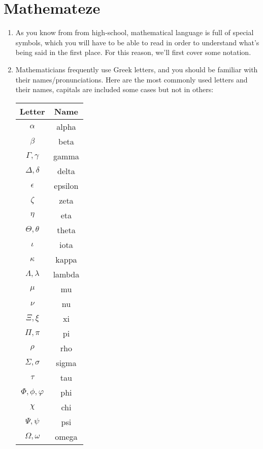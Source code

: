 \section{Mathemateze}

\begin{enumerate}[{\thesection}.1]

		\item As you know from from high-school, mathematical language is full of special symbols, which you will have to be able to read in order to understand what's being said in the first place. For this reason, we'll first cover some notation.
		
		\item Mathematicians frequently use Greek letters, and you should be familiar with their names/pronunciations. Here are the most commonly used letters and their names, capitals are included some cases but not in others:
	
		\begin{longtable}{c | c}
			Letter & Name\\\hline
			$\alpha$ & alpha \\
			$\beta$ & beta\\
			$\Gamma,\gamma$ & gamma\\
			$\Delta,\delta$ & delta\\
			$\epsilon$ & epsilon\\
			$\zeta$ & zeta\\
			$\eta$ & eta\\
			$\Theta,\theta$ & theta\\
			$\iota$ & iota\\
			$\kappa$ & kappa\\
			$\Lambda,\lambda$ & lambda\\
			$\mu$ & mu\\
			$\nu$ & nu\\
			$\Xi,\xi$ & xi\\
			$\Pi,\pi$ & pi\\
			$\rho$ & rho\\
			$\Sigma,\sigma$&sigma\\
			$\tau$ & tau\\
			$\Phi,\phi,\varphi$ & phi\\
			$\chi$ & chi\\
			$\Psi,\psi$ & psi\\
			$\Omega,\omega$ & omega
			\end{longtable}
			

\end{enumerate}
